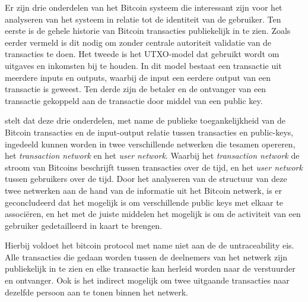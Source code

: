 Er zijn drie onderdelen van het Bitcoin systeem die interessant zijn voor het analyseren van het systeem in relatie tot de identiteit van de gebruiker. Ten eerste is de gehele historie van Bitcoin transacties publiekelijk in te zien. Zoals eerder vermeld is dit nodig om zonder centrale autoriteit validatie van de transacties te doen. Het tweede is het UTXO-model dat gebruikt wordt om uitgaves en inkomsten bij te houden. In dit model bestaat een transactie uit meerdere inputs en outputs, waarbij de input een eerdere output van een transactie is geweest. Ten derde zijn de betaler en de ontvanger van een transactie gekoppeld aan de transactie door middel van een public key. 

\cite{reid2013analysis} stelt dat deze drie onderdelen, met name de publieke toegankelijkheid van de Bitcoin transacties en de input-output relatie tussen transacties en public-keys, ingedeeld kunnen worden in twee verschillende netwerken die tesamen opereren, het \textit{transaction network} en het \textit{user network}. Waarbij het \textit{transaction network} de stroom van Bitcoins beschrijft tussen transacties over de tijd, en het \textit{user network} tussen gebruikers over de tijd. Door het analyseren van de structuur van deze twee netwerken aan de hand van de informatie uit het Bitcoin netwerk, is er geconcludeerd dat het mogelijk is om verschillende public keys met elkaar te associëren, en het met de juiste middelen het mogelijk is om de activiteit van een gebruiker gedetailleerd in kaart te brengen.

Hierbij voldoet het bitcoin protocol met name niet aan de de untraceability eis. Alle transacties die gedaan worden tussen de deelnemers van het netwerk zijn publiekelijk in te zien en elke transactie kan herleid worden naar de verstuurder en ontvanger. Ook is het indirect mogelijk om twee uitgaande transacties naar dezelfde persoon aan te tonen binnen het netwerk.
